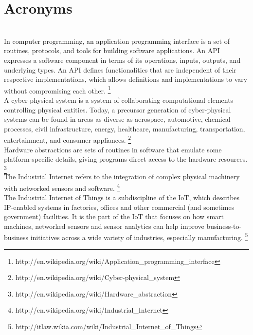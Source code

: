 \section{Acronyms}
\label{acronyms}

\begin{acronym}
	\\
		In computer programming, an application programming interface is a set
		of routines, protocols, and tools for building software applications.
		An API expresses a software component in terms of its operations,
		inputs, outputs, and underlying types. An API defines functionalities
		that are independent of their respective implementations, which allows
		definitions and implementations to vary without compromising each
		other.
		\footnote{http://en.wikipedia.org/wiki/Application\_programming\_interface}
	\\
		A cyber-physical system is a system of collaborating computational
		elements controlling physical entities. Today, a precursor generation
		of cyber-physical systems can be found in areas as diverse as
		aerospace, automotive, chemical processes, civil infrastructure,
		energy, healthcare, manufacturing, transportation, entertainment, and
		consumer appliances.
		\footnote{http://en.wikipedia.org/wiki/Cyber-physical\_system}
	\\
		Hardware abstractions are sets of routines in software that emulate
		some platform-specific details, giving programs direct access to the
		hardware resources.
		\footnote{http://en.wikipedia.org/wiki/Hardware\_abstraction}
	\\
		The Industrial Internet refers to the integration of complex physical
		machinery with networked sensors and software.
		\footnote{http://en.wikipedia.org/wiki/Industrial\_Internet}
	\\
		The Industrial Internet of Things is a subdiscipline of the \acs{IoT},
		which describes IP-enabled systems in factories, offices and other
		commercial (and sometimes government) facilities. It is the part of the
		\acs{IoT} that focuses on how smart machines, networked sensors and
		sensor analytics can help improve business-to-business initiatives
		across a wide variety of industries, especially manufacturing.
		\footnote{http://itlaw.wikia.com/wiki/Industrial\_Internet\_of\_Things}
	\\

\end{acronym}
